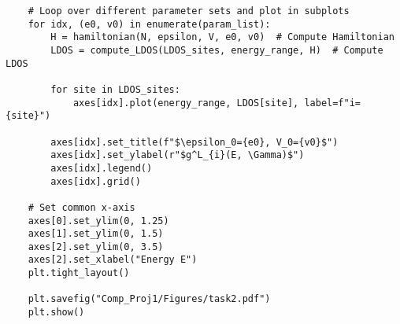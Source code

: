 \begin{verbatim}
    # Loop over different parameter sets and plot in subplots
    for idx, (e0, v0) in enumerate(param_list):
        H = hamiltonian(N, epsilon, V, e0, v0)  # Compute Hamiltonian
        LDOS = compute_LDOS(LDOS_sites, energy_range, H)  # Compute LDOS
        
        for site in LDOS_sites:
            axes[idx].plot(energy_range, LDOS[site], label=f"i={site}")
        
        axes[idx].set_title(f"$\epsilon_0={e0}, V_0={v0}$")
        axes[idx].set_ylabel(r"$g^L_{i}(E, \Gamma)$")
        axes[idx].legend()
        axes[idx].grid()
    
    # Set common x-axis
    axes[0].set_ylim(0, 1.25)
    axes[1].set_ylim(0, 1.5)
    axes[2].set_ylim(0, 3.5)
    axes[2].set_xlabel("Energy E")
    plt.tight_layout()
    
    plt.savefig("Comp_Proj1/Figures/task2.pdf")
    plt.show()    
\end{verbatim}

